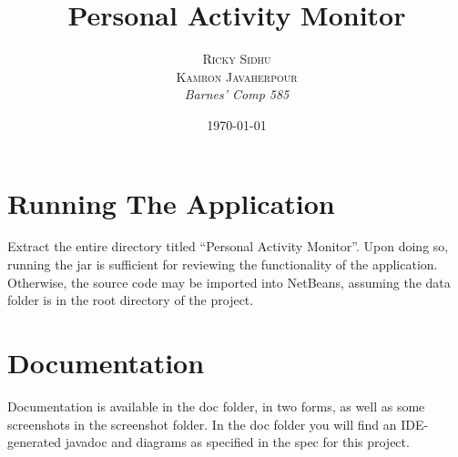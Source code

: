 \documentclass[12pt,a4paper]{article} %
\title{\textbf{Personal Activity Monitor}}
\author{\textsc{Ricky Sidhu \\ Kamron Javaherpour} %
\\{\textit{Barnes' Comp 585}}} %
\date{\today} %
\makeatletter
\renewcommand{\maketitle}{ %
\begin{flushright} %
{\LARGE\@title} %

\vspace{50pt} %

{\large\@author} %

\vspace{40pt} %
\end{flushright}
}
\makeatother
\begin{document}
\doublespacing
\maketitle %

\section*{Running The Application}
Extract the entire directory titled ``Personal Activity Monitor''. Upon doing so, running the jar is sufficient for reviewing the functionality of the application. Otherwise, the source code may be imported into NetBeans, assuming the data folder is in the root directory of the project.

\section*{Documentation}
Documentation is available in the doc folder, in two forms, as well as some screenshots in the screenshot folder. In the doc folder you will find an IDE-generated javadoc and diagrams as specified in the spec for this project.
\end{document}
